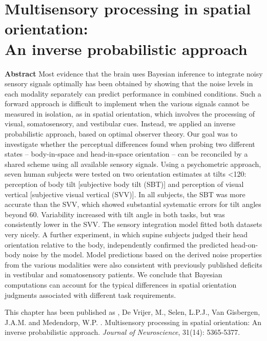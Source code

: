 
\chapter{Multisensory processing in spatial orientation:\\An inverse probabilistic approach}
\chaptermark{}
\label{p1}

\newpage

\small {\bf Abstract} Most evidence that the brain uses Bayesian inference to integrate noisy sensory signals optimally has been obtained by showing that the noise levels in each modality separately can predict performance in combined conditions. Such a forward approach is difficult to implement when the various signals cannot be measured in isolation, as in spatial orientation, which involves the processing of visual, somatosensory, and vestibular cues. Instead, we applied an inverse probabilistic approach, based on optimal observer theory. Our goal was to investigate whether the perceptual differences found when probing two different states -- body-in-space and head-in-space orientation -- can be reconciled by a shared scheme using all available sensory signals. Using a psychometric approach, seven human subjects were tested on two orientation estimates at tilts \textless 120\textdegree: perception of body tilt [subjective body tilt (SBT)] and perception of visual vertical [subjective visual vertical (SVV)]. In all subjects, the SBT was more accurate than the SVV, which showed substantial systematic errors for tilt angles beyond 60\textdegree. Variability increased with tilt angle in both tasks, but was consistently lower in the SVV. The sensory integration model fitted both datasets very nicely. A further experiment, in which supine subjects judged their head orientation relative to the body, independently confirmed the predicted head-on-body noise by the model. Model predictions based on the derived noise properties from the various modalities were also consistent with previously published deficits in vestibular and somatosensory patients. We conclude that Bayesian computations can account for the typical differences in spatial orientation judgments associated with different task requirements.

\vfill

\noindent\underline{ \hspace{4cm} }

\noindent This chapter has been published as \newline
{}, De Vrijer, M., Selen, L.P.J., Van Gisbergen, J.A.M. and Medendorp, W.P. \citeyear{clemens2011}. Multisensory processing in spatial orientation: An inverse probabilistic approach. \emph{Journal of Neuroscience}, 31(14): 5365-5377. \newline

